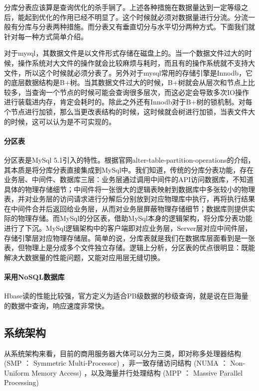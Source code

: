 \documentclass[letter]{book}
\begin{document}
分库分表应该算是查询优化的杀手锏了。上述各种措施在数据量达到一定等级之后，能起到优化的作用已经不明显了。这个时候就必须对数据量进行分流。分流一般有分库与分表两种措施。而分表又有垂直切分与水平切分两种方式。下面我们就针对每一种方式简单介绍。

对于mysql，其数据文件是以文件形式存储在磁盘上的。当一个数据文件过大的时候，操作系统对大文件的操作就会比较麻烦与耗时，而且有的操作系统就不支持大文件，所以这个时候就必须分表了。另外对于mysql常用的存储引擎是Innodb，它的底层数据结构是B+树。当其数据文件过大的时候，B+树就会从层次和节点上比较多，当查询一个节点的时候可能会查询很多层次，而这必定会导致多次IO操作进行装载进内存，肯定会耗时的。除此之外还有Innodb对于B+树的锁机制。对每个节点进行加锁，那么当更改表结构的时候，这时候就会树进行加锁，当表文件大的时候，这可以认为是不可实现的。

\paragraph{分区表}

分区表是MySql 5.1引入的特性。根据官网alter-table-partition-operations的介绍，其本质是将分库分表直接集成到MySql中。我们知道，传统的分库分表功能，存在业务层、中间件、数据库三层：业务层通过调用中间件的API访问数据库，不知道具体的物理存储细节；中间件将一张很大的逻辑表映射到数据库中多张较小的物理表，并对业务层的访问请求进行分解后分别放到对应物理库中执行，再将执行结果在中间件合并后返回给业务层，从而对业务层屏蔽物理存储细节；数据库则提供实际的物理存储。而MySql的分区表，借助MySql本身的逻辑架构，将分库分表功能进行了下沉。MySql逻辑架构中的客户端即对应业务层，Server层对应中间件层，存储引擎层对应物理存储层。简单的说，分库表就是我们在数据库层面看到是一张表，但物理上是分成多个文件独立存储。逻辑上分析，分区表的优点很明显：既能解决大数据量的性能问题，又能对应用层无缝切换。

\paragraph{采用NoSQL数据库}

Hbase读的性能比较强，官方定义为适合PB级数据的秒级查询，就是说在巨海量的数据中查询，响应速度非常快。

\subsection{系统架构}

从系统架构来看，目前的商用服务器大体可以分为三类，即对称多处理器结构 (SMP ： Symmetric Multi-Processor) ，非一致存储访问结构 (NUMA ： Non-Uniform Memory Access) ，以及海量并行处理结构 (MPP ： Massive Parallel Processing) 
\end{document}
